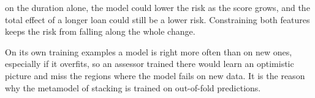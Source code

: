 \begin{description}[font=\bfseries,leftmargin=0pt,itemsep=5pt]
on the duration alone, the model could lower the risk as the score grows, and the total
effect of a longer loan could still be a lower risk. Constraining both features keeps the
risk from falling along the whole change.
\item[\ref{exr2:assessor}] On its own training examples a model is right more often than on new
ones, especially if it overfits, so an assessor trained there would learn an optimistic picture and
miss the regions where the model fails on new data. It is the reason why the metamodel of
stacking is trained on out-of-fold predictions.
\end{description}

